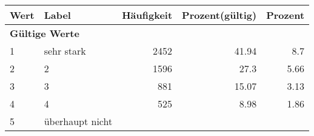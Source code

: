      \begin{longtable}{lXrrr}
     \toprule
     \textbf{Wert} & \textbf{Label} & \textbf{Häufigkeit} & \textbf{Prozent(gültig)} & \textbf{Prozent} \\
     \endhead
     \midrule
     \multicolumn{5}{l}{\textbf{Gültige Werte}}\\

     1 &
     \multicolumn{1}{X}{ sehr stark   } &


       \num{2452} &
       \num[round-mode=places,round-precision=2]{41.94} &
         \num[round-mode=places,round-precision=2]{8.7} \\

     2 &
     \multicolumn{1}{X}{ 2   } &


       \num{1596} &
       \num[round-mode=places,round-precision=2]{27.3} &
         \num[round-mode=places,round-precision=2]{5.66} \\

     3 &
     \multicolumn{1}{X}{ 3   } &


       \num{881} &
       \num[round-mode=places,round-precision=2]{15.07} &
         \num[round-mode=places,round-precision=2]{3.13} \\

     4 &
     \multicolumn{1}{X}{ 4   } &


       \num{525} &
       \num[round-mode=places,round-precision=2]{8.98} &
         \num[round-mode=places,round-precision=2]{1.86} \\

     5 &
     \multicolumn{1}{X}{ überhaupt nicht   } &



\end{longtable}
